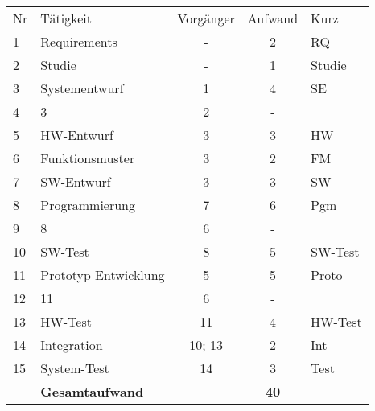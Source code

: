 \documentclass{beamer}
\newcommand{\hlblue}{%
 \usebeamercolor[fg]{normal text}%
 \only{\usebeamercolor[fg]{kblue}}}
\begin{document}
\begin{frame}[t,shrink=65]



\begin{columns}

{\Large

\par\vspace{2cm}\noindent       %

    \begin{tabular}{l|lccl}
      \hline
      Nr & Tätigkeit        & Vorgänger & Aufwand & Kurz \\
      1  & Requirements     & -     & 2 & RQ \\
      2  & Studie           & -     & 1 & Studie \\
      3  & Systementwurf    & 1     & 4 & SE \\
      4  &   3              & 2     & - & \\
      5  & HW-Entwurf       & 3     & 3 & HW \\
      6  & Funktionsmuster  & 3     & 2 & FM \\
      7  & SW-Entwurf       & 3     & 3 & SW \\
      8  & Programmierung   & 7     & 6 & Pgm \\
      9  & 8                & 6     & - & \\
      10 & SW-Test          & 8     & 5 & SW-Test \\
      11 & Prototyp-Entwicklung & 5 & 5 & Proto \\
      12 & 11               & 6     & - & \\
      13 & HW-Test          & 11    & 4 & HW-Test \\
      14 & Integration      & 10; 13 & 2 & Int \\
      15 & System-Test      & 14    & 3 & Test \\
      \hline
        & \textbf{Gesamtaufwand} &   & \textbf{40} \\
    \end{tabular}
}


\end{columns}
\end{frame}
\end{document}
